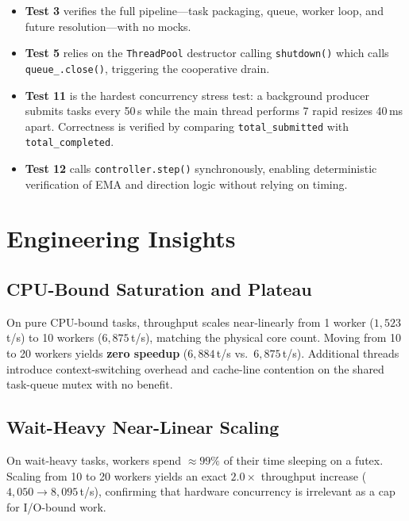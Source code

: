 \documentclass[12pt,a4paper]{article}
\begin{document}
\begin{itemize}
  \item \textbf{Test 3} verifies the full pipeline---task packaging, queue,
        worker loop, and future resolution---with no mocks.
  \item \textbf{Test 5} relies on the \texttt{ThreadPool} destructor calling
        \texttt{shutdown()} which calls \texttt{queue\_.close()}, triggering
        the cooperative drain.
  \item \textbf{Test 11} is the hardest concurrency stress test: a background
        producer submits tasks every 50\,\textmu s while the main thread
        performs 7 rapid resizes 40\,ms apart.
        Correctness is verified by comparing \texttt{total\_submitted} with
        \texttt{total\_completed}.
  \item \textbf{Test 12} calls \texttt{controller.step()} synchronously,
        enabling deterministic verification of EMA and direction logic
        without relying on timing.
\end{itemize}

\section{Engineering Insights}

\subsection{CPU-Bound Saturation and Plateau}

On pure CPU-bound tasks, throughput scales near-linearly from 1 worker
($1,523$\,t/s) to 10 workers ($6,875$\,t/s), matching the physical core
count.
Moving from 10 to 20 workers yields \textbf{zero speedup}
($6,884$\,t/s vs.\ $6,875$\,t/s).
Additional threads introduce context-switching overhead and cache-line
contention on the shared task-queue mutex with no benefit.

\subsection{Wait-Heavy Near-Linear Scaling}

On wait-heavy tasks, workers spend $\approx 99\%$ of their time sleeping
on a futex.
Scaling from 10 to 20 workers yields an exact $2.0\times$ throughput
increase ($4,050 \to 8,095$\,t/s), confirming that hardware concurrency
is irrelevant as a cap for I/O-bound work.
\end{document}
